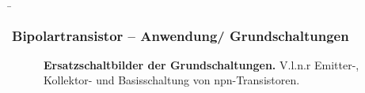 \begin{frame}
    \b{ \frametitle{Bipolartransistor -- Anwendung/ Grundschaltungen}
        \begin{figure}[H]
            \label{fig:ErsatzschaltbilderEmitter-Kollektor-UndBasisschaltungFolien}
            \caption{\textbf{Ersatzschaltbilder der Grundschaltungen.} V.l.n.r Emitter-, Kollektor- und Basisschaltung von npn-Transistoren.} 
        \end{figure}}
\end{frame}


